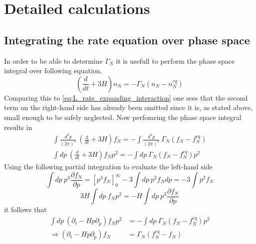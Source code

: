 \chapter{Detailed calculations}
\section{Integrating the rate equation over phase space}
\label{ap:phase_space}
In order to be able to determine $\Gamma_N$ it is usefull to perform the phase space integral over following equation. 
\begin{equation*}
\left(\frac{d}{dt}+3H\right)n_N=-\Gamma_N\left(n_N-n_N^{eq}\right)
\end{equation*}
Comparing this to \ref{eq:L_rate_expanding_interaction} one sees that the second term on the right-hand side has already been omitted since it is, as stated above, small enough to be safely neglected. \newline
Now perfomring the phase space integral results in
\begin{align*}
\int\frac{d^3p}{\left(2\pi\right)^3}\: \left(\frac{d}{dt}+3H\right)f_N=-\int\frac{d^3p}{\left(2\pi\right)^3}\:\Gamma_N\left(f_N-f_N^{eq}\right)\\
\int dp\: \left(\frac{d}{dt}+3H\right)f_Np^2=-\int dp\:\Gamma_N\left(f_N-f_N^{eq}\right)p^2
\end{align*}
Using the following partial integration to evaluate the left-hand side
\begin{equation*}
\int dp\:p^3\frac{\partial f_N}{\partial p}=\left[p^3f_N\right]_0^\infty-3\int dp\:p^2f_Ndp=-3\int p^2f_N
\end{equation*}
\begin{equation*}
3H\int dp\: f_Np^2=-H\int dp\: p^3\frac{\partial f_N}{\partial p}
\end{equation*}
it follows that
\begin{align*}
\int  dp\:\left(\partial_t-Hp\partial_p\right)f_Np^2&=-\int dp\:\Gamma_N\left(f_N-f_N^{eq}\right)p^2\\
\Rightarrow \left(\partial_t-Hp\partial_p\right)f_N&=\Gamma_N\left(f_N^{eq}-f_N\right)
\end{align*}
